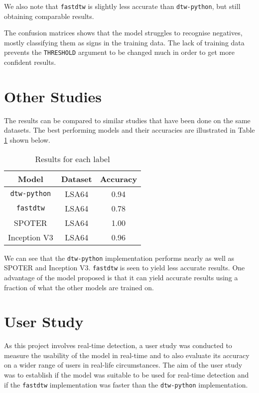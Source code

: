 \documentclass[final,rdr32.tex]{subfiles}
\begin{document}
We also note that \verb|fastdtw| is slightly less accurate than \verb|dtw-python|, but still obtaining comparable results.

The confusion matrices shows that the model struggles to recognise negatives, mostly classifying them as signs in the training data. The lack of training data prevents the \verb|THRESHOLD| argument to be changed much in order to get more confident results.
\section{Other Studies}

The results can be compared to similar studies that have been done on the same datasets. The best performing models and their accuracies are illustrated in Table \ref{tab:studies} shown below.

\begin{table}[H]
    \begin{center}
        \begin{tabular}{ |c|c|c| }
            \hline
            Model                              & Dataset & Accuracy \\
            \hline
            \verb|dtw-python|                  & LSA64   & 0.94     \\
            \verb|fastdtw|                     & LSA64   & 0.78     \\
            SPOTER \cite{bohavcek2022sign}     & LSA64   & 1.00     \\
            Inception V3 \cite{rajput2022sign} & LSA64   & 0.96     \\
            \hline
        \end{tabular}
    \end{center}
    \caption{Results for each label}
    \label{tab:studies}
\end{table}

We can see that the \verb|dtw-python| implementation performs nearly as well as SPOTER and Inception V3. \verb|fastdtw| is seen to yield less accurate results. One advantage of the model proposed is that it can yield accurate results using a fraction of what the other models are trained on.

\section{User Study}

As this project involves real-time detection, a user study was conducted to measure the usability of the model in real-time and to also evaluate its accuracy on a wider range of users in real-life circumstances. The aim of the user study was to establish if the model was suitable to be used for real-time detection and if the \verb|fastdtw| implementation was faster than the \verb|dtw-python| implementation.
\end{document}
